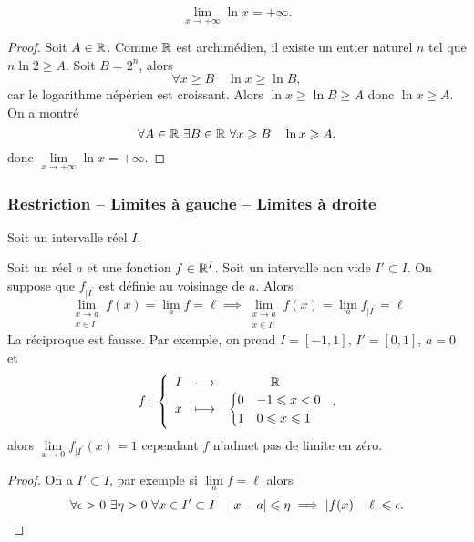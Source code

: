 \begin{theo}
  \begin{equation}
    \lim\limits_{x \to +\infty} \ln x = + \infty.
  \end{equation}
\end{theo}
\begin{proof}
  Soit \(A \in \mathbb{R}\). Comme \(\mathbb{R}\) est archimédien, il existe un entier naturel \(n\) tel que \(n \ln 2 \geqslant A\). Soit \(B=2^n\), alors
  \begin{equation}
    \forall x \geqslant B \quad \ln x \geqslant \ln B,
  \end{equation}
  car le logarithme népérien est croissant. Alors \(\ln x \geqslant \ln B \geqslant A\) donc \(\ln x \geqslant A\). On a montré
\begin{equation}
  \forall A \in \mathbb{R} \ \exists B \in \mathbb{R} \ \forall x \geqslant B \quad \ln x \geqslant A,
\end{equation}
donc \(\lim\limits_{x \to +\infty} \ln x = + \infty\).
\end{proof}

\subsubsection{Restriction -- Limites à gauche -- Limites à droite}
Soit un intervalle réel \(I\).
\begin{prop}
  Soit un réel \(a\) et une fonction \(f \in \mathbb{R}^I\). Soit un intervalle non vide \(I' \subset I\). On suppose que \(f_{|I^{'}}\) est définie au voisinage de \(a\). Alors
  \begin{equation}
    \lim\limits_{\begin{array}{l} x \to a \\ x \in I\end{array}}f(x)=\lim\limits_{a}f=\ell \implies \lim\limits_{\begin{array}{l} x \to a \\ x \in I'\end{array}}f(x)=\lim\limits_{a}f_{|I^{'}}=\ell
  \end{equation}
La réciproque est fausse. Par exemple, on prend \(I=[-1,1]\), \(I'=[0,1]\), \(a=0\) et
\begin{equation}
  f\colon \left\{\begin{array}{ccc} I & \longrightarrow &\mathbb{R}\\ x & \longmapsto & \begin{cases} 0 & -1 \leqslant x < 0 \\ 1 & 0 \leqslant x \leqslant 1\end{cases} \end{array} \right.,
\end{equation}
alors \(\lim\limits_{x \to 0}f_{|I^{'}}(x)=1\) cependant \(f\) n'admet pas de limite en zéro.
\end{prop}
\begin{proof}
  On a \( I' \subset I\), par exemple si \(\lim\limits_{a} f =\ell\) alors
  \begin{equation}
    \forall \epsilon > 0 \ \exists \eta > 0 \ \forall x \in I' \subset I \quad \left\lvert x-a\right\rvert \leqslant \eta \implies \left\lvert f(x) - \ell\right\rvert \leqslant \epsilon.
  \end{equation}
\end{proof}


